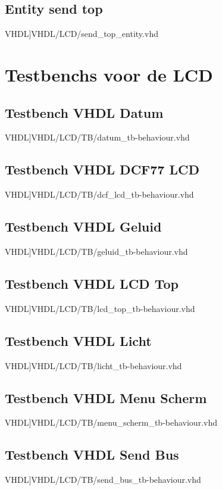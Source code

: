 \subsection{Entity send top}
\scriptsize 
 VHDL]{VHDL/LCD/send_top_entity.vhd}
\normalsize
\label{code:struc_send_top}

\section{Testbenchs voor de LCD}
\subsection{Testbench VHDL Datum}
\scriptsize 
 VHDL]{VHDL/LCD/TB/datum_tb-behaviour.vhd}
\normalsize
\label{code:tb_datum}
\subsection{Testbench VHDL DCF77 LCD}
\scriptsize 
 VHDL]{VHDL/LCD/TB/dcf_lcd_tb-behaviour.vhd}
\normalsize
\label{code:tb_dcf_lcd}
\subsection{Testbench VHDL Geluid}
\scriptsize 
 VHDL]{VHDL/LCD/TB/geluid_tb-behaviour.vhd}
\normalsize
\label{code:tb_geluid}
\subsection{Testbench VHDL LCD Top}
\scriptsize 
 VHDL]{VHDL/LCD/TB/lcd_top_tb-behaviour.vhd}
\normalsize
\label{code:tb_lcd_top}
\subsection{Testbench VHDL Licht}
\scriptsize 
 VHDL]{VHDL/LCD/TB/licht_tb-behaviour.vhd}
\normalsize
\label{code:tb_licht}
\subsection{Testbench VHDL Menu Scherm}
\scriptsize 
 VHDL]{VHDL/LCD/TB/menu_scherm_tb-behaviour.vhd}
\normalsize
\label{code:tb_menu_scherm}
\subsection{Testbench VHDL Send Bus}
\scriptsize 
 VHDL]{VHDL/LCD/TB/send_bus_tb-behaviour.vhd}
\normalsize
\label{code:tb_send_bus}
